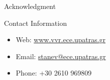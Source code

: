 \documentclass[final]{beamer}
\newlength{\onecolwid}
\begin{document}
\begin{frame}[t]
\begin{columns}[t]
\begin{column}{\onecolwid}
\begin{block}{Acknowledgment}
\end{block}




\begin{alertblock}{Contact Information}
	
	\begin{itemize}
		\item Web: \href{www.vvr.ece.upatras.gr}{www.vvr.ece.upatras.gr}
		\item Email: \href{mailto:stanev@ece.upatras.gr}{stanev@ece.upatras.gr}
		\item Phone: +30 2610 969809
	\end{itemize}
	
\end{alertblock}

\end{column} %


\end{columns} %

\end{frame} %
\end{document}
